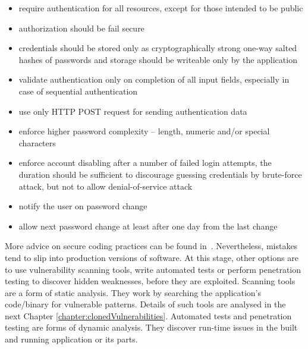     \begin{itemize}
      \item require authentication for all resources, except for those intended to be public
      \item authorization should be fail secure
      \item credentials should be stored only as cryptographically strong one-way salted hashes of passwords
            and storage should be writeable only by the application
      \item validate authentication only on completion of all input fields, especially in case of sequential
            authentication
      \item use only HTTP POST request for sending authentication data
      \item enforce higher password complexity -- length, numeric and/or special characters
      \item enforce account disabling after a number of failed login attempts, the duration should
            be sufficient to discourage guessing credentials by brute-force attack, but not to allow
            denial-of-service attack
      \item notify the user on password change
      \item allow next password change at least after one day from the last change
    \end{itemize}

  \bigskip

  More advice on secure coding practices can be found in~\cite{SecureCodingPractices}. Nevertheless, mistakes
  tend to slip into production versions of software. At this stage, other options are to use vulnerability
  scanning tools, write automated tests or perform penetration testing to discover hidden weaknesses, before
  they are exploited. Scanning tools are a form of static analysis. They work by searching the application's
  code/binary for vulnerable patterns. Details of such tools are analysed in the next Chapter
  \ref{chapter:clonedVulnerabilities}. Automated tests and penetration testing are forms of dynamic analysis.
  They discover run-time issues in the built and running application or its parts.

